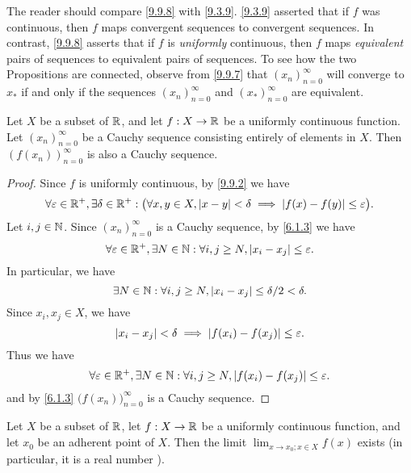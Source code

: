 \begin{rmk}\label{9.9.9}
  The reader should compare \cref{9.9.8} with \cref{9.3.9}.
  \cref{9.3.9} asserted that if \(f\) was continuous, then \(f\) maps convergent sequences to convergent sequences.
  In contrast, \cref{9.9.8} asserts that if \(f\) is \emph{uniformly} continuous, then \(f\) maps \emph{equivalent} pairs of sequences to equivalent pairs of sequences.
  To see how the two Propositions are connected, observe from \cref{9.9.7} that \((x_n)_{n = 0}^\infty\) will converge to \(x_*\) if and only if the sequences \((x_n)_{n = 0}^\infty\) and \((x_*)_{n = 0}^\infty\) are equivalent.
\end{rmk}

\setcounter{thm}{11}
\begin{prop}\label{9.9.12}
  Let \(X\) be a subset of \(\mathbb{R}\), and let \(f : X \to \mathbb{R}\) be a uniformly continuous function.
  Let \((x_n)_{n = 0}^\infty\) be a Cauchy sequence consisting entirely of elements in \(X\).
  Then \((f(x_n))_{n = 0}^\infty\) is also a Cauchy sequence.
\end{prop}

\begin{proof}
  Since \(f\) is uniformly continuous, by \cref{9.9.2} we have
  \[
    \forall \varepsilon \in \mathbb{R}^+, \exists \delta \in \mathbb{R}^+ : \big(\forall x, y \in X, \left\lvert x - y\right\rvert < \delta \implies \left\lvert f(x) - f(y)\right\rvert \leq \varepsilon\big).
  \]
  Let \(i, j \in \mathbb{N}\).
  Since \((x_n)_{n = 0}^\infty\) is a Cauchy sequence, by \cref{6.1.3} we have
  \[
    \forall \varepsilon \in \mathbb{R}^+, \exists N \in \mathbb{N} : \forall i, j \geq N, \left\lvert x_i - x_j\right\rvert \leq \varepsilon.
  \]
  In particular, we have
  \[
    \exists N \in \mathbb{N} : \forall i, j \geq N, \left\lvert x_i - x_j\right\rvert \leq \delta / 2 < \delta.
  \]
  Since \(x_i, x_j \in X\), we have
  \[
    \left\lvert x_i - x_j\right\rvert < \delta \implies \left\lvert f(x_i) - f(x_j)\right\rvert \leq \varepsilon.
  \]
  Thus we have
  \[
    \forall \varepsilon \in \mathbb{R}^+, \exists N \in \mathbb{N} : \forall i, j \geq N, \left\lvert f(x_i) - f(x_j)\right\rvert \leq \varepsilon.
  \]
  and by \cref{6.1.3} \(\big(f(x_n)\big)_{n = 0}^\infty\) is a Cauchy sequence.
\end{proof}

\setcounter{thm}{13}
\begin{cor}\label{9.9.14}
  Let \(X\) be a subset of \(\mathbb{R}\), let \(f : X \to \mathbb{R}\) be a uniformly continuous function, and let \(x_0\) be an adherent point of \(X\).
  Then the limit \(\lim_{x \to x_0 ; x \in X} f(x)\) exists
  (in particular, it is a real number ).
\end{cor}


